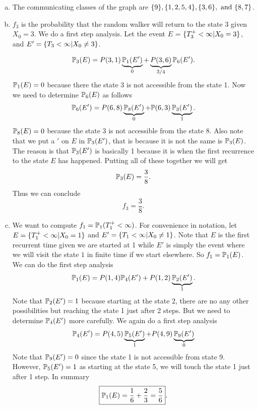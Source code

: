 \begin{solution}
\begin{enumerate}[(a)]
		\item The communicating classes of the graph are $\set{9}, \set{1,2,5,4}, \set{3,6},\ \text{and}\ \set{8,7}$.
		
		\item $f_3$ is the probability that the random walker will return to the state 3 given $X_0=3$. We do a first step analysis. Let the event $E$ = $\{T^+_3 < \infty| X_0 = 3\}$, and $E' = \{T_3 < \infty| X_0 \neq 3\}$.
		
		\[ \mathbb{P}_3(E) = P(3,1)\underbrace{\mathbb{P}_1(E')}_{0} + \underbrace{P(3,6)}_{3/4}\mathbb{P}_6(E').\]
		$\mathbb{P}_1(E)=0$ because there the state 3 is not accessible from the state 1. Now we need to determine $\mathbb{P}_6(E)$ as follows
		\[ \mathbb{P}_6(E') = P(6,8)\underbrace{\mathbb{P}_8(E')}_{0} + \mathbb{P}(6,3)\underbrace{\mathbb{P}_3(E')}_{1}. \]
		$\mathbb{P}_8(E)=0$ because the state 3 is not accessible from the state 8. Also note that we put a $'$ on $E$ in $\mathbb{P}_3(E')$, that is because it is not the same is $\mathbb{P}_3(E)$. The reason is that $\mathbb{P}_3(E')$ is basically 1 because it is when the first recurrence to the state $E$ has happened. Putting all of these together we will get
		\[ \mathbb{P}_3(E) = \frac{3}{8}. \]
		Thus we can conclude 
		\[ \boxed{f_3 = \frac{3}{8} }.\]
		
		\item We want to compute $f_1 = \mathbb{P}_1(T_1^+ < \infty)$. For convenience in notation, let $E = \{T_1^+ <\infty|X_0=1\}$ and $E' = \{T_1 < \infty|X_0\neq 1\}$. Note that $E$ is the first recurrent time given we are started at 1 while $E'$ is simply the event where we will visit the state $1$ in finite time if we start elsewhere. So $f_1 = \mathbb{P}_1(E)$. We can do the first step analysis
		\[ \mathbb{P}_1(E) = P(1,4)\mathbb{P}_4(E') + P(1,2)\underbrace{\mathbb{P}_2(E')}_{1}. \]
		Note that $\mathbb{P}_2(E') = 1$ because starting at the state 2, there are no any other possibilities but reaching the state 1 just after 2 steps. But we need to determine $\mathbb{P}_4(E')$ more carefully. We again do a first step analysis
		\[ \mathbb{P}_4(E') = P(4,5)\underbrace{ \mathbb{P}_5(E')}_{1} + P(4,9) \underbrace{\mathbb{P}_9(E')}_{0} \]
		Note that $\mathbb{P}_9(E') = 0$ since the state 1 is not accessible from state 9. However, $\mathbb{P}_5(E')=1$ as starting at the state 5, we will touch the state 1 just after 1 step. In summary
		\[\boxed{ \mathbb{P}_1(E) = \frac{1}{6} + \frac{2}{3} = \frac{5}{6}}. \]
	\end{enumerate}
\end{solution}



